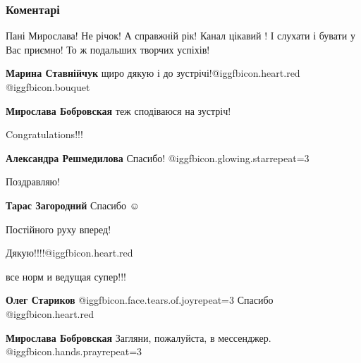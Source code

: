  
 
 
 
 
\subsubsection{Коментарі}

\begin{itemize} %

Пані Мирослава!
Не річок! А справжній рік!
Канал цікавий ! І слухати і бувати у Вас приємно!
То ж подальших творчих успіхів!

\begin{itemize} %
\textbf{Марина Ставнійчук} щиро дякую і до зустрічі!@igg{fbicon.heart.red} @igg{fbicon.bouquet} 

\textbf{Мирослава Бобровская} теж сподіваюся на зустріч!

\end{itemize} %

Congratulations!!!

\textbf{Александра Решмедилова} Спасибо! @igg{fbicon.glowing.star}{repeat=3} 


Поздравляю!


\textbf{Тарас Загородний} Спасибо  ☺ ️ 

Постійного руху вперед!

Дякую!!!!@igg{fbicon.heart.red}

все норм и ведущая супер!!!

\begin{itemize} %
\textbf{Олег Стариков}  @igg{fbicon.face.tears.of.joy}{repeat=3} Спасибо @igg{fbicon.heart.red}

\textbf{Мирослава Бобровская} Загляни, пожалуйста, в мессенджер.  @igg{fbicon.hands.pray}{repeat=3} 
\end{itemize} %


\end{itemize}
